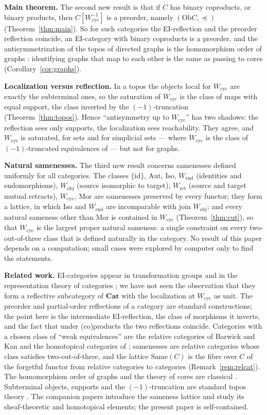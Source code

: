 \documentclass[11pt]{amsart}
\theoremstyle{definition}
\newcommand{\Same}{\mathrm{Same}}
\newcommand{\Mor}{\mathrm{Mor}}
\newcommand{\Iso}{\mathrm{Iso}}
\newcommand{\Aut}{\mathrm{Aut}}
\newcommand{\Ob}{\mathrm{Ob}}
\newcommand{\Wcyc}{W_{\mathrm{cyc}}}
\newcommand{\Wobj}{W_{\mathrm{obj}}}
\newcommand{\Wend}{W_{\mathrm{end}}}
\newcommand{\Wret}{W_{\mathrm{ret}}}
\newcommand{\Cat}{\mathbf{Cat}}
\begin{document}
\medskip\noindent\textbf{Main theorem.} The second new result is that if
$C$ has binary coproducts, or binary products, then $C[\Wcyc^{-1}]$ is a
preorder, namely $(\Ob C,\preceq)$ (Theorem~\ref{thm:main}). So for such categories the EI-reflection and the
preorder reflection coincide, an EI-category with binary coproducts is a
preorder, and the antisymmetrization of the topos of directed graphs is the
homomorphism order of graphs \cite{HN}: identifying graphs that map to each
other is the same as passing to cores (Corollary~\ref{cor:graphs}).

\medskip\noindent\textbf{Localization versus reflection.} In a topos the
objects local for $\Wcyc$ are exactly the subterminal ones, so the
saturation of $\Wcyc$ is the class of maps with equal support, the class
inverted by the $(-1)$-truncation (Theorem~\ref{thm:topos}). Hence
``antisymmetry up to $\Wcyc$'' has two shadows: the reflection sees only
supports, the localization sees reachability. They agree, and $\Wcyc$ is
saturated, for sets and for simplicial sets --- where $\Wcyc$ is the class of
$(-1)$-truncated equivalences of \cite{Postnikov} --- but not for graphs.

\medskip\noindent\textbf{Natural samenesses.} The third new result
concerns samenesses defined uniformly for all categories. The classes $\{\mathrm{id}\}$,
$\Aut$, $\Iso$, $\Wend$ (identities and endomorphisms), $\Wobj$ (source
isomorphic to target), $\Wret$ (source and target mutual retracts), $\Wcyc$,
$\Mor$ are samenesses preserved by every functor; they form a lattice, in
which $\Iso$ and $\Wend$ are incomparable with join $\Wobj$; and every
natural sameness other than $\Mor$ is contained in $\Wcyc$
(Theorem~\ref{thm:cut}), so that $\Wcyc$ is the largest proper natural
sameness: a single constraint on every two-out-of-three class that is
defined naturally in the category. No result of this paper depends on a
computation; small cases were explored by computer only to find the
statements.

\medskip\noindent\textbf{Related work.} EI-categories appear in
transformation groups \cite{Lueck} and in the representation theory of
categories \cite{Webb}; we have not seen the observation that they form a
reflective subcategory of $\Cat$ with the localization at $\Wcyc$ as unit.
The preorder and partial-order reflections of a category are standard
constructions; the point here is the intermediate EI-reflection, the class
of morphisms it inverts, and the fact that under (co)products the two
reflections coincide.
Categories with a chosen class of ``weak equivalences'' are the relative
categories of Barwick and Kan \cite{BK} and the homotopical categories of
\cite{DHKS}; samenesses are relative categories whose class satisfies
two-out-of-three, and the lattice $\Same(C)$ is the fibre over $C$ of the
forgetful functor from relative categories to categories
(Remark~\ref{rem:relcat}). The homomorphism order of graphs and the theory
of cores are classical \cite{HN}. Subterminal objects, supports and the
$(-1)$-truncation are standard topos theory \cite{Elephant,MLM}. The
companion papers \cite{Same,Postnikov,Topjoin} introduce the sameness
lattice and study its sheaf-theoretic and homotopical elements; the present
paper is self-contained.
\end{document}
